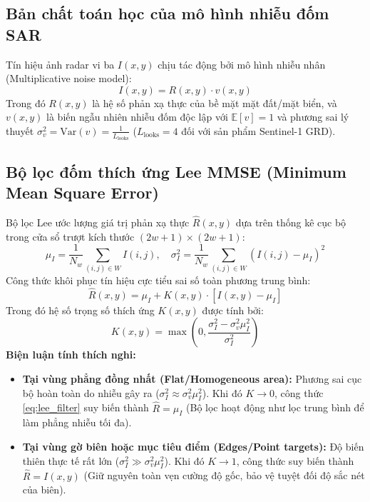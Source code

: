 \subsection{Bản chất toán học của mô hình nhiễu đốm SAR}
Tín hiệu ảnh radar vi ba $I(x, y)$ chịu tác động bởi mô hình nhiễu nhân (Multiplicative noise model):
\begin{equation}
I(x, y) = R(x, y) \cdot v(x, y)
\label{eq:speckle_model}
\end{equation}
Trong đó $R(x, y)$ là hệ số phản xạ thực của bề mặt mặt đất/mặt biển, và $v(x, y)$ là biến ngẫu nhiên nhiễu đốm độc lập với $\mathbb{E}[v] = 1$ và phương sai lý thuyết $\sigma_v^2 = \text{Var}(v) = \frac{1}{L_{\text{looks}}}$ ($L_{\text{looks}} = 4$ đối với sản phẩm Sentinel-1 GRD).

\subsection{Bộ lọc đốm thích ứng Lee MMSE (Minimum Mean Square Error)}
Bộ lọc Lee \cite{lee1980digital} ước lượng giá trị phản xạ thực $\hat{R}(x, y)$ dựa trên thống kê cục bộ trong cửa sổ trượt kích thước $(2w+1) \times (2w+1)$:
\begin{equation}
\mu_I = \frac{1}{N_w} \sum_{(i,j) \in W} I(i, j), \quad \sigma_I^2 = \frac{1}{N_w} \sum_{(i,j) \in W} \left( I(i, j) - \mu_I \right)^2
\label{eq:local_stats}
\end{equation}
Công thức khôi phục tín hiệu cực tiểu sai số toàn phương trung bình:
\begin{equation}
\hat{R}(x, y) = \mu_I + K(x, y) \cdot [I(x, y) - \mu_I]
\label{eq:lee_filter}
\end{equation}
Trong đó hệ số trọng số thích ứng $K(x, y)$ được tính bởi:
\begin{equation}
K(x, y) = \max\left(0, \frac{\sigma_I^2 - \sigma_v^2 \mu_I^2}{\sigma_I^2}\right)
\label{eq:lee_k}
\end{equation}
\textbf{Biện luận tính thích nghi:}
\begin{itemize}
    \item \textbf{Tại vùng phẳng đồng nhất (Flat/Homogeneous area):} Phương sai cục bộ hoàn toàn do nhiễu gây ra ($\sigma_I^2 \approx \sigma_v^2 \mu_I^2$). Khi đó $K \to 0$, công thức \eqref{eq:lee_filter} suy biến thành $\hat{R} = \mu_I$ (Bộ lọc hoạt động như lọc trung bình để làm phẳng nhiễu tối đa).
    \item \textbf{Tại vùng gờ biên hoặc mục tiêu điểm (Edges/Point targets):} Độ biến thiên thực tế rất lớn ($\sigma_I^2 \gg \sigma_v^2 \mu_I^2$). Khi đó $K \to 1$, công thức suy biến thành $\hat{R} = I(x, y)$ (Giữ nguyên toàn vẹn cường độ gốc, bảo vệ tuyệt đối độ sắc nét của biên).
\end{itemize}



